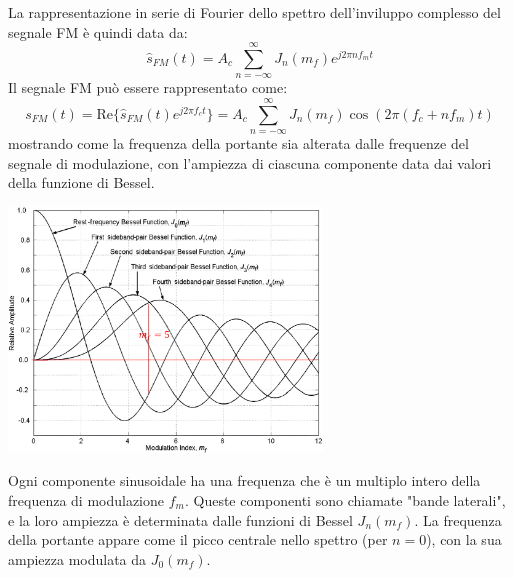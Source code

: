 La rappresentazione in serie di Fourier dello spettro dell'inviluppo complesso del segnale FM è quindi data da:
\[
    \hat{s}_{FM}(t) = A_c \sum_{n=-\infty}^{\infty} J_n(m_f) e^{j 2\pi n f_m t}
\]
Il segnale FM può essere rappresentato come:
\[
    s_{FM}(t) = \text{Re}\{ \hat{s}_{FM}(t) e^{j 2\pi f_c t} \} = A_c \sum_{n=-\infty}^{\infty} J_n(m_f) \cos(2\pi (f_c + n f_m) t)
\]
mostrando come la frequenza della portante sia alterata dalle frequenze del segnale di modulazione, con l'ampiezza di ciascuna componente data dai valori della funzione di Bessel.
\begin{center}
    \includegraphics[width=0.625\textwidth]{imgs/bessel1.png}
\end{center}

\begin{center}
\end{center}

Ogni componente sinusoidale ha una frequenza che è un multiplo intero della frequenza di modulazione \( f_m \).
Queste componenti sono chiamate "bande laterali", e la loro ampiezza è determinata dalle funzioni di Bessel \( J_n(m_f) \).
La frequenza della portante appare come il picco centrale nello spettro (per \( n = 0 \)), con la sua ampiezza modulata da \( J_0(m_f) \).

